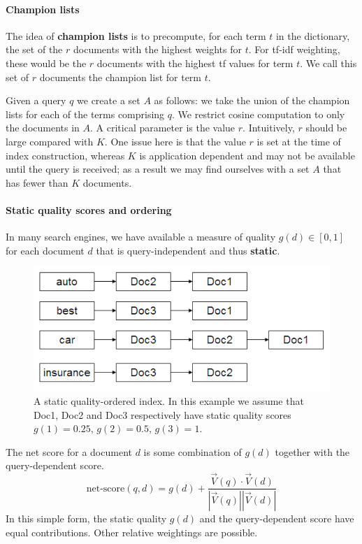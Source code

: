 \documentclass[letterpaper,11pt]{article}
\begin{document}
\paragraph{Champion lists}
The idea of \textbf{champion lists} is to precompute, for each term $t$ in the dictionary, the set of the $r$ documents with the highest weights for $t$. For tf-idf weighting, these would be the $r$ documents with the highest tf values for term $t$. We call this set of $r$ documents the champion list for term $t$.

Given a query $q$ we create a set $A$ as follows: we take the union of the champion lists for each of the terms comprising $q$. We restrict cosine computation to only the documents in $A$. A critical parameter is the value $r$. Intuitively, $r$ should be large compared with $K$. One issue here is that the value $r$ is set at the time of index construction, whereas $K$ is application dependent and may not be available until the query is received; as a result we may find ourselves with a set $A$ that has fewer than $K$ documents.

\paragraph{Static quality scores and ordering}
In many search engines, we have available a measure of quality $g(d) \in [0, 1]$ for each document $d$ that is query-independent and thus \textbf{static}.
\begin{figure}[H]
    \centering
    \includegraphics[scale=0.45]{sect7/figure_7_2.png}
    \caption{A static quality-ordered index. In this example we assume that Doc1, Doc2 and Doc3 respectively have static quality scores $g(1) = 0.25$, $g(2) = 0.5$, $g(3) = 1$.}
\end{figure}

The net score for a document $d$ is some combination of $g(d)$ together with the query-dependent score.
\[
\textrm{net-score}(q,d) = g(d) + \frac{\vec{V}(q) \cdot \vec{V}(d)}{|\vec{V}(q)| |\vec{V}(d)|}
\]
In this simple form, the static quality $g(d)$ and the query-dependent score have equal contributions. Other relative weightings are possible.
\end{document}
